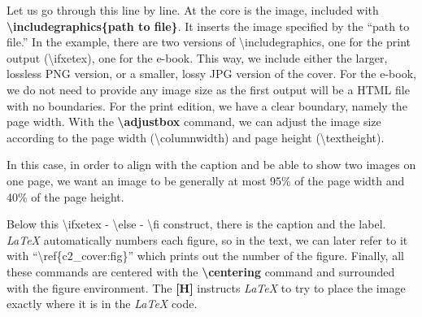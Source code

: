 Let us go through this line by line. At the core is the image, included with \textbf{\textbackslash includegraphics\{path to file\}}. It inserts the image specified by the ``path to file.'' In the example, there are two versions of \textbackslash includegraphics, one for the print output (\textbackslash ifxetex), one for the e-book. This way, we include either the larger, lossless PNG version, or a smaller, lossy JPG version of the cover. For the e-book, we do not need to provide any image size as the first output will be a HTML file with no boundaries. For the print edition, we have a clear boundary, namely the page width. With the \textbf{\textbackslash adjustbox} command, we can adjust the image size according to the page width (\textbackslash columnwidth) and page height (\textbackslash textheight). 

In this case, in order to align with the caption and be able to show two images on one page, we want an image to be generally at most 95\% of the page width and 40\% of the page height.

Below this \textbackslash ifxetex - \textbackslash else - \textbackslash fi construct, there is the caption and the label. \textit{LaTeX} automatically numbers each figure, so in the text, we can later refer to it with ``\textbackslash ref\{c2\_cover:fig\}'' which prints out the number of the figure. Finally, all these commands are centered with the \textbf{\textbackslash centering} command and surrounded with the figure environment. The \textbf{[H]} instructs \textit{LaTeX} to try to place the image exactly where it is in the \textit{LaTeX} code. 

